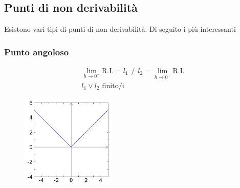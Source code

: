 \documentclass{report}
\begin{document}
    \subsection{Punti di non derivabilità}
        Esistono vari tipi di punti di non derivabilità. Di seguito i più interessanti
        \subsubsection{Punto angoloso}
            $$\begin{array}{c}
                \lim_{h \to 0^-} \textrm{R.I.} = l_1 \neq  l_2 = \lim_{h \to 0^+} \textrm{R.I.} \\
                l_1 \vee l_2 \textrm{ finito/i }
            \end{array}$$
            \begin{center}
                \begin{figure}[H]
                    \includegraphics[width = 0.4\textwidth, height = 0.4\textwidth]{puntoangolos.png}
                \end{figure}
            \end{center}
\end{document}
